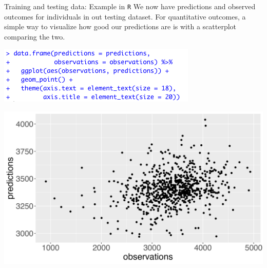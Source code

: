 \documentclass[10pt,t]{beamer}
\begin{document}
\begin{frame}{Training and testing data: Example in \texttt{R}}
We now have predictions and observed outcomes for individuals in out testing dataset. For quantitative outcomes, a simple way to visualize how good our predictions are is with a scatterplot comparing the two.

\vspace{0.3cm}

\centering \includegraphics[scale=0.4]{predict_vs_obs_code.png} \vspace{0.1cm}

\includegraphics[scale=0.3]{predict_vs_obs.png}

\end{frame}
\end{document}
